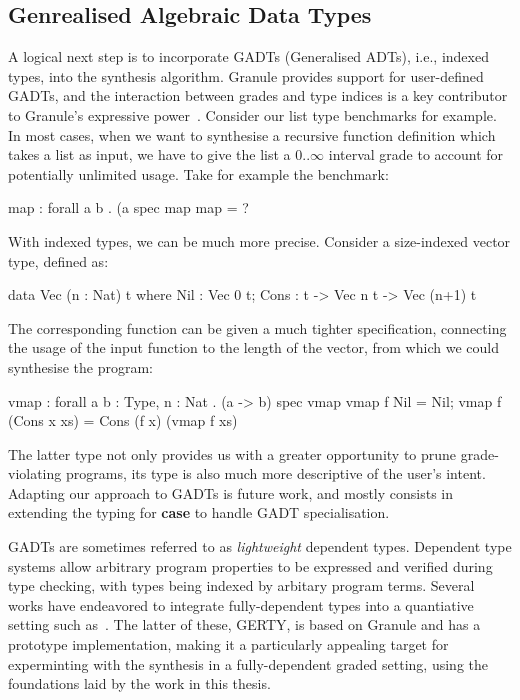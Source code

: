 \subsection{Genrealised Algebraic Data Types}
A logical next step is to incorporate GADTs (Generalised ADTs),
i.e., indexed types,  into the synthesis algorithm.
Granule provides support for user-defined GADTs, and the interaction
between grades and type indices is a key contributor to Granule's expressive power~\citep{DBLP:journals/pacmpl/OrchardLE19}.
Consider our list type benchmarks for example. In most cases, when we want to
synthesise a recursive function definition which takes a list as input, we have
to give the list a $0..\infty$ interval grade to account for potentially unlimited
usage. Take for example the  benchmark:
\begin{granule}
map : forall a b . (a %
spec
    map %
map = ?
\end{granule}
With indexed types, we can be much more precise. Consider a size-indexed vector type,
defined as:
\begin{granule}
data Vec (n : Nat) t where
  Nil  : Vec 0 t;
  Cons : t -> Vec n t -> Vec (n+1) t
\end{granule}
%
The corresponding  function
can be given a much tighter specification, connecting the usage of the
input function to the length of the vector, from which we could
synthesise the program:
\begin{granule}
vmap : forall {a b : Type, n : Nat} . (a -> b) %
spec
    vmap %
vmap f Nil = Nil;
vmap f (Cons x xs) = Cons (f x) (vmap f xs)
\end{granule}
The latter type not only provides us with a greater opportunity to prune
grade-violating programs, its type is also much more descriptive of the user's intent.
Adapting our approach to GADTs is future work, and mostly consists in extending
the typing for \textbf{case} to handle GADT specialisation.

GADTs are sometimes referred to as \emph{lightweight} dependent types. Dependent
type systems allow arbitrary program properties to be expressed and verified
during type checking, with types being indexed by arbitary program terms.
Several works have endeavored to integrate fully-dependent types into a
quantiative setting such as~\cite{}. The latter of these, \textsc{GERTY}, is
based on Granule and has a prototype implementation, making it a particularly
appealing target for experminting with the synthesis in a fully-dependent graded
setting, using the foundations laid by the work in this thesis.


